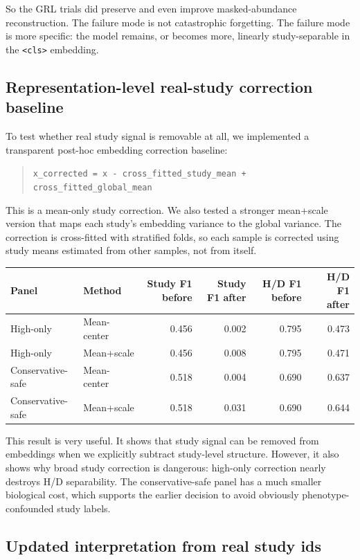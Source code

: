 \documentclass[11pt]{article}
\newcommand{\code}[1]{\texttt{\small #1}}
\begin{document}
So the GRL trials did preserve and even improve masked-abundance reconstruction. The
failure mode is not catastrophic forgetting. The failure mode is more specific: the
model remains, or becomes more, linearly study-separable in the \code{<cls>} embedding.

\subsection{Representation-level real-study correction baseline}

To test whether real study signal is removable at all, we implemented a transparent
post-hoc embedding correction baseline:

\begin{quote}
\code{x\_corrected = x - cross\_fitted\_study\_mean + cross\_fitted\_global\_mean}
\end{quote}

This is a mean-only study correction. We also tested a stronger mean+scale version that
maps each study's embedding variance to the global variance. The correction is
cross-fitted with stratified folds, so each sample is corrected using study means
estimated from other samples, not from itself.

\begin{center}
\begin{tabular}{llrrrr}
\toprule
Panel & Method & Study F1 before & Study F1 after & H/D F1 before & H/D F1 after \\
\midrule
High-only & Mean-center & 0.456 & 0.002 & 0.795 & 0.473 \\
High-only & Mean+scale & 0.456 & 0.008 & 0.795 & 0.471 \\
Conservative-safe & Mean-center & 0.518 & 0.004 & 0.690 & 0.637 \\
Conservative-safe & Mean+scale & 0.518 & 0.031 & 0.690 & 0.644 \\
\bottomrule
\end{tabular}
\end{center}

This result is very useful. It shows that study signal can be removed from embeddings
when we explicitly subtract study-level structure. However, it also shows why broad
study correction is dangerous: high-only correction nearly destroys H/D separability.
The conservative-safe panel has a much smaller biological cost, which supports the
earlier decision to avoid obviously phenotype-confounded study labels.

\subsection{Updated interpretation from real study ids}
\end{document}
